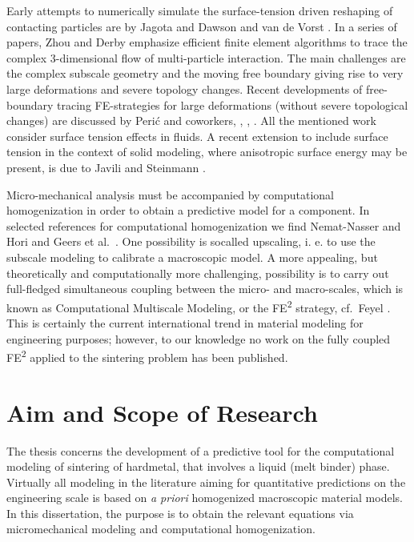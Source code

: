\documentclass[MikaelDissertation.tex]{subfiles}
\begin{document}
Early attempts to numerically simulate the surface-tension driven reshaping of contacting particles are by Jagota and Dawson \cite{jagota_micromechanical_1988,jagota_micromechanical_1988-1} and van de Vorst \cite{van_de_vorst_integral_1993}.
In a series of papers, Zhou and Derby \cite{zhou_three-dimensional_1998,zhou_assessment_2001} emphasize efficient finite element algorithms to trace the complex 3-dimensional flow of multi-particle interaction.
The main challenges  are the complex subscale geometry and the moving free boundary giving rise to very large deformations and severe topology changes.
Recent developments of free-boundary tracing FE-strategies for large deformations (without severe topological changes) are discussed by Peri\'c and coworkers, \cite{dettmer_computational_2006}, \cite{saksono_finite_2006}, \cite{saksono_finite_2006-1}.
All the mentioned work consider surface tension effects in fluids.
A recent extension to include surface tension in the context of solid modeling, where anisotropic surface energy may be present, is due to Javili and Steinmann \cite{javili_finite_2010}.

Micro-mechanical analysis must be accompanied by computational homogenization in order to obtain a predictive model for a component.
In selected references for computational homogenization we find Nemat-Nasser and Hori \cite{nemat-nasser_micromechanics:_1993} and Geers et al.\ \cite{geers_multi-scale_2010}.
One possibility is socalled upscaling, i. e. to use the subscale modeling to calibrate a macroscopic model.
A more appealing, but theoretically and computationally more challenging, possibility is to carry out full-fledged simultaneous coupling between the micro- and macro-scales, which is known as Computational Multiscale Modeling, or the FE\textsuperscript{2} strategy, cf.\ Feyel \cite{feyel_multilevel_2003}.
This is certainly the current international trend in material modeling for engineering purposes; however, to our knowledge no work on the fully coupled FE\textsuperscript{2} applied to the sintering problem has been published.

\chapter{Aim and Scope of Research}

The thesis concerns the development of a predictive tool for the computational modeling of sintering of hardmetal, that involves a liquid (melt binder) phase.
Virtually all modeling in the literature aiming for quantitative predictions on the engineering scale is based on \emph{a priori} homogenized macroscopic material models.
In this dissertation, the purpose is to obtain the relevant equations via micromechanical modeling and computational homogenization.
\end{document}

